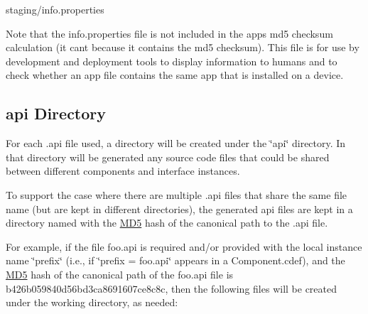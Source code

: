 \begin{DoxyItemize}
\item staging/info.\+properties
\end{DoxyItemize}

Note that the info.\+properties file is not included in the app\textquotesingle{}s md5 checksum calculation (it can\textquotesingle{}t because it contains the md5 checksum). This file is for use by development and deployment tools to display information to humans and to check whether an app file contains the same app that is installed on a device.\hypertarget{mkToolsDesign_mkToolsDesign_workingDirs_api}{}\subsection{api Directory}\label{mkToolsDesign_mkToolsDesign_workingDirs_api}
For each .api file used, a directory will be created under the \char`\"{}api\char`\"{} directory. In that directory will be generated any source code files that could be shared between different components and interface instances.

To support the case where there are multiple .api files that share the same file name (but are kept in different directories), the generated api files are kept in a directory named with the \hyperlink{class_m_d5}{M\+D5} hash of the canonical path to the .api file.

For example, if the file foo.\+api is required and/or provided with the local instance name \char`\"{}prefix\char`\"{} (i.\+e., if \char`\"{}prefix = foo.\+api\char`\"{} appears in a Component.\+cdef), and the \hyperlink{class_m_d5}{M\+D5} hash of the canonical path of the foo.\+api file is b426b059840d56bd3ca8691607ce8c8c, then the following files will be created under the working directory, as needed\+:


